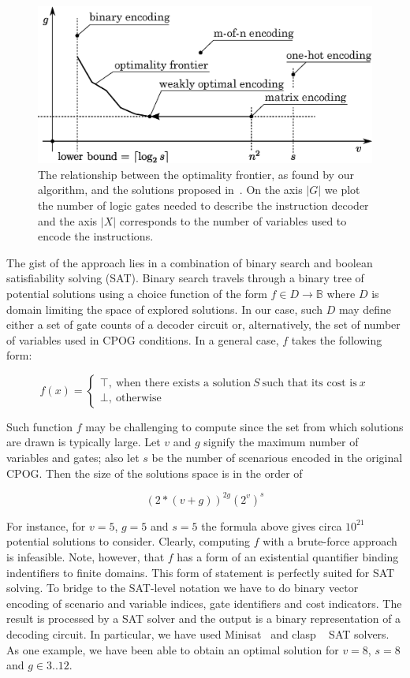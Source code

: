 \begin{figure}[t]
\centering
\includegraphics[scale=0.7]{fig/optimality_frontier}
\caption[The optimality frontier]{\label{fig:pareto}The relationship between the optimality frontier, as found by our algorithm, and the solutions proposed in~\cite{2009_mokhov_phd}. On the axis $|G|$ we plot the number of logic gates needed to describe the instruction decoder and the axis $|X|$ corresponds to the number of variables used to encode the instructions.}
\end{figure} 
 
The gist of the approach lies in a combination of binary search and boolean satisfiability solving (SAT). Binary search travels through a binary tree of potential solutions using a choice function of the form $f \in D \rightarrow \mathbb{B}$ where $D$ is domain limiting the space of explored solutions. In our case, such $D$ may define either a set of gate counts of a decoder circuit or, alternatively, the set of number of variables used in CPOG conditions. In a general case, $f$ takes the following form: 

$$f(x) = \left \{ \begin{array}{l} \top,~ \text{when there exists a solution} ~ S ~ \text{such that its cost is}~ x \\ \bot,~ \text{otherwise}  \end{array} \right .$$   

\noindent
Such function $f$ may be challenging to compute since the set from which solutions are drawn is typically large. Let $v$ and $g$ signify the maximum number of variables and gates; also let $s$ be the number of scenarious encoded in the original CPOG. Then the size of the solutions space is in the order of 

$$\left (2 * (v + g) \right )^{2g} \left (2^{v} \right )^{s}$$  

\noindent For instance, for $v=5$, $g=5$ and $s=5$ the formula above gives circa $10^{21}$ potential solutions to consider. Clearly, computing $f$ with a brute-force approach is infeasible. Note, however, that $f$ has a form of an existential quantifier binding indentifiers to finite domains. This form of statement is perfectly suited for SAT solving. To bridge to the SAT-level notation we have to do binary vector encoding of scenario and variable indices, gate identifiers and cost indicators. The result is processed by a SAT solver and the output is a binary representation of a decoding circuit. In particular, we have used Minisat~\cite{minisat} and clasp ~\cite{clasp} SAT solvers. As one example, we have been able to obtain an optimal solution for $v=8$, $s=8$ and $g \in 3 .. 12$.     
